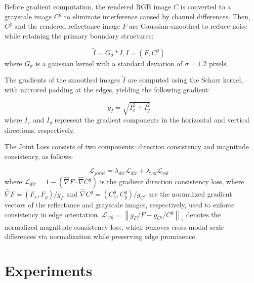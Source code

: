 \documentclass[letterpaper, 10 pt, conference]{ieeeconf}  %
\begin{document}
Before gradient computation, the rendered RGB image $C$ is converted to a grayscale image $C^{g}$ to eliminate interference caused by channel differences. Then, $C^{g}$ and the rendered reflectance image $F$ are Gaussian-smoothed to reduce noise while retaining the primary boundary structures:

\begin{equation}
	\label{eq14}
\tilde{I}=G_{\sigma} * I,I=(F,C^{g})
\end{equation}
where $G_{\sigma}$ is a gaussian kernel with a standard deviation of $\sigma = 1.2$ pixels. 

The gradients of the smoothed images $\tilde{I}$ are computed using the Scharr kernel, with mirrored padding at the edges, yielding the following gradient:

\begin{equation}
	\label{eq15}
g_{I}=\sqrt{I_{x}^{2}+I_{y}^{2}}
\end{equation}
where $I_{x}$ and $I_{y}$ represent the gradient components in the horizontal and vertical directions, respectively. 

The Joint Loss consists of two components: direction consistency and magnitude consistency, as follows:

\begin{equation}
	\label{eq16}
\mathcal{L}_{joint}= \lambda_{dir}\mathcal{L}_{dir} + \lambda_{val}\mathcal{L}_{val}
\end{equation}
where $\mathcal{L}_{dir}=1-(\hat{\nabla} F \cdot \hat{\nabla} C^{g})$ is the gradient direction consistency loss, where $\hat{\nabla} F = \left(F_{x}, F_{y}\right)/g_{F}$ and $\hat{\nabla} C^{g} = \left(C_{x}^{g}, C_{y}^{g}\right)/g_{C^{g}}$ are the normalized gradient vectors of the reflectance and grayscale images, respectively, used to enforce consistency in edge orientation. $\mathcal{L}_{val}=\left\| g_{F}/{F} - g_{C^{g}}/{C^{g}} \right\|_{1}$ denotes the normalized magnitude consistency loss, which removes cross-modal scale differences via normalization while preserving edge prominence. 





\section{Experiments}
\end{document}
